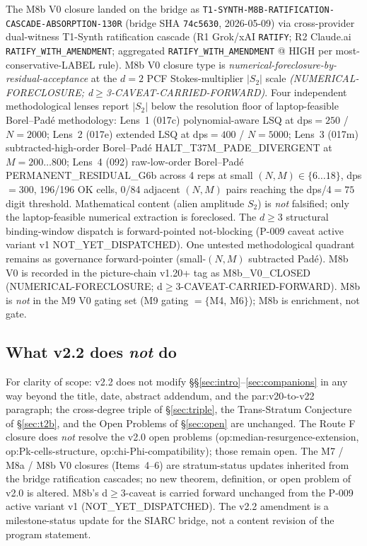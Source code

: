 \documentclass[11pt,a4paper]{article}
\theoremstyle{definition}
\theoremstyle{remark}
\begin{document}
The M8b V0 closure landed on the bridge as
\texttt{T1-SYNTH-M8B-RATIFICATION-CASCADE-ABSORPTION-130R} (bridge
SHA \texttt{74c5630}, 2026-05-09) via cross-provider dual-witness
T1-Synth ratification cascade (R1 Grok/xAI \verb|RATIFY|; R2
Claude.ai \verb|RATIFY_WITH_AMENDMENT|; aggregated
\verb|RATIFY_WITH_AMENDMENT| @ HIGH per most-conservative-LABEL
rule). M8b V0 closure type is
\emph{numerical-foreclosure-by-residual-acceptance} at the $d=2$ PCF
Stokes-multiplier $|S_2|$ scale \emph{(NUMERICAL-FORECLOSURE; d$\geq$3-CAVEAT-CARRIED-FORWARD)}.
Four independent methodological
lenses report $|S_2|$ below the resolution floor of laptop-feasible
Borel--Pad\'e methodology: Lens~1 (017c) polynomial-aware LSQ at
dps$=250$ / $N=2000$; Lens~2 (017e) extended LSQ at dps$=400$ /
$N=5000$; Lens~3 (017m) subtracted-high-order Borel--Pad\'e
\textsf{HALT\_T37M\_PADE\_DIVERGENT} at $M=200{\ldots}800$; Lens~4
(092) raw-low-order Borel--Pad\'e \textsf{PERMANENT\_RESIDUAL\_G6b}
across 4 reps at small $(N,M) \in \{6{\ldots}18\}$, dps$=300$,
196/196 OK cells, 0/84 adjacent $(N,M)$ pairs reaching the
dps/4$=75$ digit threshold. Mathematical content (alien amplitude
$S_2$) is \emph{not} falsified; only the laptop-feasible numerical
extraction is foreclosed. The $d \geq 3$ structural binding-window
dispatch is forward-pointed not-blocking (P-009 caveat active
variant v1 \textsf{NOT\_YET\_DISPATCHED}). One untested
methodological quadrant remains as governance forward-pointer
(small-$(N,M)$ subtracted Pad\'e). M8b V0 is recorded in the
picture-chain v1.20+ tag as \textsf{M8b\_V0\_CLOSED (NUMERICAL-FORECLOSURE; d$\geq$3-CAVEAT-CARRIED-FORWARD)}.
M8b is \emph{not} in the M9 V0 gating set (M9 gating $= \{$M4, M6$\}$);
M8b is enrichment, not gate.

\subsection{What v2.2 does \emph{not} do}
\label{sec:closure-cascade-out-of-scope}

For clarity of scope: v2.2 does not modify \S\S\ref{sec:intro}--\ref{sec:companions}
in any way beyond the title, date, abstract addendum, and the
\textsf{par:v20-to-v22} paragraph; the cross-degree triple of
\S\ref{sec:triple}, the Trans-Stratum Conjecture of
\S\ref{sec:t2b}, and the Open Problems of \S\ref{sec:open} are
unchanged. The Route F closure does \emph{not} resolve the v2.0
open problems
(\textsf{op:median-resurgence-extension}, \textsf{op:Pk-cells-structure},
\textsf{op:chi-Phi-compatibility}); those remain open. The M7 / M8a /
M8b V0 closures (Items~4--6) are stratum-status updates inherited
from the bridge ratification cascades; no new theorem, definition,
or open problem of v2.0 is altered. M8b's d$\geq$3-caveat is
carried forward unchanged from the P-009 active variant v1
(\textsf{NOT\_YET\_DISPATCHED}). The v2.2 amendment is a
milestone-status update for the SIARC bridge, not a content
revision of the program statement.
\end{document}
